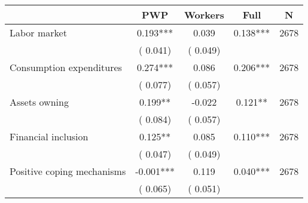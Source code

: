 
\begin{tabular}{l*{4}{c}}\hline&\multicolumn{1}{c}{PWP}&\multicolumn{1}{c}{Workers}&\multicolumn{1}{c}{Full}&\multicolumn{1}{c}{N} \\ \hline

 Labor market &              0.193*** &         0.039 &           0.138*** & 2678                       \\  
                 &        (       0.041)                   &        (       0.049)                        &                                                             &                                                      \\      

 Consumption expenditures &              0.274*** &         0.086 &           0.206*** & 2678                       \\  
                 &        (       0.077)                   &        (       0.057)                        &                                                             &                                                      \\      

 Assets owning &              0.199** &        -0.022 &           0.121** & 2678                       \\  
                 &        (       0.084)                   &        (       0.057)                        &                                                             &                                                      \\      

 Financial inclusion &              0.125** &         0.085 &           0.110*** & 2678                       \\  
                 &        (       0.047)                   &        (       0.049)                        &                                                             &                                                      \\      

 Positive coping mechanisms &             -0.001*** &         0.119 &           0.040*** & 2678                       \\  
                 &        (       0.065)                   &        (       0.051)                        &                                                             &                                                      \\      


\end{tabular}
